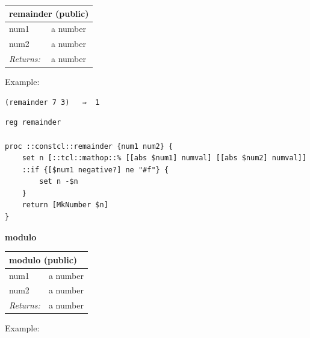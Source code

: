 \documentclass[twoside,9pt]{report}
\begin{document}
\begin{tabular}{ |l l| }
\hline
\multicolumn{2}{|l|}{remainder (public)} \\
\hline
num1 & a number \\
num2 & a number \\
\textit{Returns:} & a number \\
\hline
\end{tabular}


Example:

\noindent\makebox[\linewidth]{\rule{\linewidth}{0.4pt}}
\begin{lstlisting}
(remainder 7 3)   ⇒  1
\end{lstlisting}
\noindent\makebox[\linewidth]{\rule{\linewidth}{0.4pt}}
\noindent\makebox[\linewidth]{\rule{\linewidth}{0.4pt}}
\begin{lstlisting}
reg remainder
 
proc ::constcl::remainder {num1 num2} {
    set n [::tcl::mathop::% [[abs $num1] numval] [[abs $num2] numval]]
    ::if {[$num1 negative?] ne "#f"} {
        set n -$n
    }
    return [MkNumber $n]
}
\end{lstlisting}
\noindent\makebox[\linewidth]{\rule{\linewidth}{0.4pt}}

\textbf{modulo}

\begin{tabular}{ |l l| }
\hline
\multicolumn{2}{|l|}{modulo (public)} \\
\hline
num1 & a number \\
num2 & a number \\
\textit{Returns:} & a number \\
\hline
\end{tabular}


Example:
\end{document}
